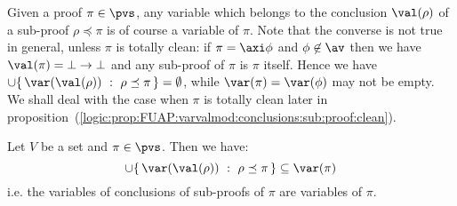 Given a proof $\pi\in\pvs$, any variable which belongs to the
conclusion $\val(\rho)$ of a sub-proof $\rho\preceq\pi$ is of course
a variable of $\pi$. Note that the converse is not true in general,
unless $\pi$ is totally clean: if $\pi=\axi\phi$ and
$\phi\not\in\av$ then we have $\val(\pi)=\bot\to\bot$ and any
sub-proof of $\pi$ is $\pi$ itself. Hence we have
$\cup\{\,\var(\val(\rho))\ :\
    \rho\preceq\pi\,\}=\emptyset$, while $\var(\pi)=\var(\phi)$ may not be
empty. We shall deal with the case when $\pi$ is totally clean later
in
proposition~(\ref{logic:prop:FUAP:varvalmod:conclusions:sub:proof:clean}).

\begin{prop}\label{logic:prop:FUAP:variable:conclusions:sub:proof}
Let $V$ be a set and $\pi\in\pvs$. Then we have:
    \begin{equation}\label{logic:eqn:FUAP:variable:conclusions:1}
    \cup\{\,\var(\val(\rho))\ :\
    \rho\preceq\pi\,\}\subseteq\var(\pi)
    \end{equation}
i.e. the variables of conclusions of sub-proofs of $\pi$ are
variables of $\pi$.
\end{prop}
